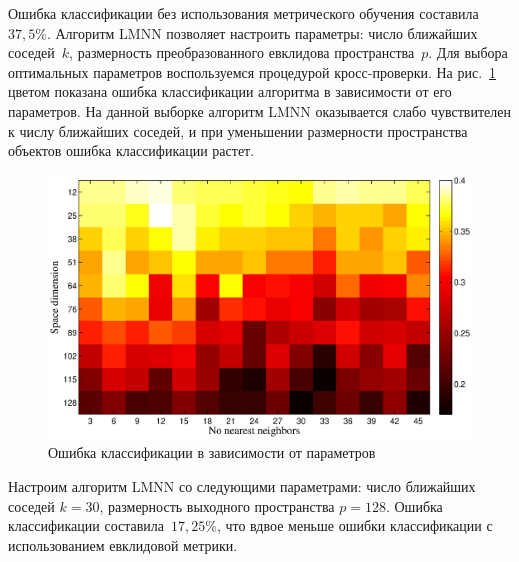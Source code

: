 	Ошибка классификации без использования метрического обучения составила~$37,5\%$.
	Алгоритм LMNN позволяет настроить параметры: число ближайших соседей~$k$,
	размерность преобразованного евклидова пространства~$p$.
	Для выбора оптимальных параметров воспользуемся процедурой кросс-проверки.
	На рис.~\ref{heat_map} цветом показана ошибка классификации алгоритма в зависимости от его параметров.
	На данной выборке алгоритм LMNN оказывается слабо чувствителен к числу ближайших соседей,
	и при уменьшении размерности пространства объектов ошибка классификации растет.
	\begin{figure}[ht]
		\centering
		\includegraphics[width=1\linewidth]{figs/ch4/heat_map}
		\caption{Ошибка классификации в зависимости от параметров}
		\label{heat_map}
	\end{figure}
	
	Настроим алгоритм LMNN со следующими параметрами: число ближайших соседей $k = 30$, размерность
	выходного пространства $p = 128$.
	Ошибка классификации составила~$17,25\%$, что вдвое меньше ошибки классификации с использованием евклидовой метрики.
	
